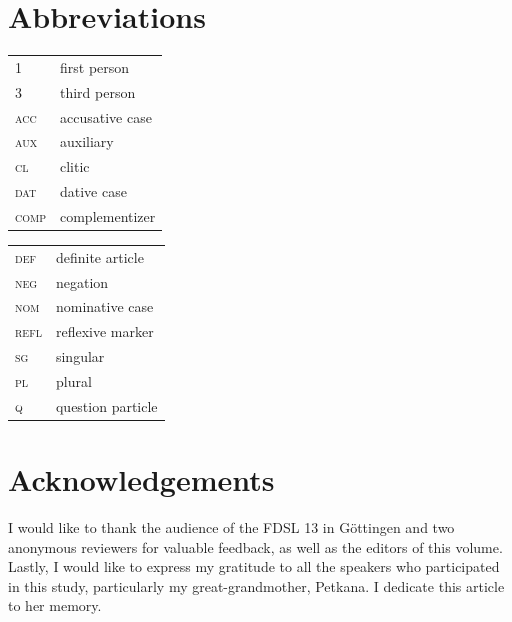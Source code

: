 \documentclass[output=paper,
colorlinks,
citecolor=brown,
newtxmath
]{langscibook}
\begin{document}

\section*{Abbreviations}

\begin{tabularx}{.5\textwidth}{@{}lQ}
\textsc{1}&first person\\
\textsc{3}&third person\\
\textsc{acc}&accusative case\\
\textsc{aux}&auxiliary\\
\textsc{cl}&clitic\\
\textsc{dat}&dative case\\
\textsc{comp}&complementizer\\
\end{tabularx}\begin{tabularx}{.5\textwidth}{lQ@{}}
\textsc{def}&definite article\\
\textsc{neg}&negation\\
\textsc{nom}&nominative case\\
\textsc{refl}&reflexive marker\\
\textsc{sg}&singular\\
\textsc{pl}&plural\\
\textsc{q}&question particle\\
\end{tabularx}


\section*{Acknowledgements}

I would like to thank the audience of the FDSL 13 in Göttingen and two anonymous reviewers for valuable feedback, as well as the editors of this volume. Lastly, I would like to express my gratitude to all the speakers who participated in this study, particularly my great-grandmother, Petkana. I dedicate this article to her memory.

\sloppy
\printbibliography[heading=subbibliography,notkeyword=this]
\end{document}

